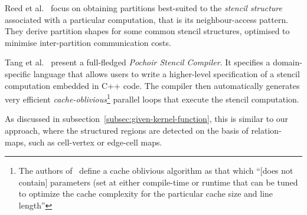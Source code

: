 
Reed et al.~\cite{reed1987stencils} focus on obtaining partitions best-suited to the \emph{stencil structure} associated with a particular computation, that is its neighbour-access pattern. They derive partition shapes for some common stencil structures, optimised to minimise inter-partition communication costs.

Tang et al.~\cite{tang2011pochoir} present a full-fledged \emph{Pochoir Stencil Compiler}. It specifies a domain-specific language that allows users to write a higher-level specification of a stencil computation embedded in C++ code. The compiler then automatically generates very efficient \emph{cache-oblivious}\footnote{The authors of~\cite{frigo1999cache} define a cache oblivious algorithm as that which ``[does not contain] parameters (set at either compile-time or runtime that can be tuned to optimize the cache complexity for the particular cache size and line length''} parallel loops that execute the stencil computation.

As discussed in subsection~\ref{subsec:given-kernel-function}, this is similar to our approach, where the structured regions are detected on the basis of relation-maps, such as cell-vertex or edge-cell maps.









